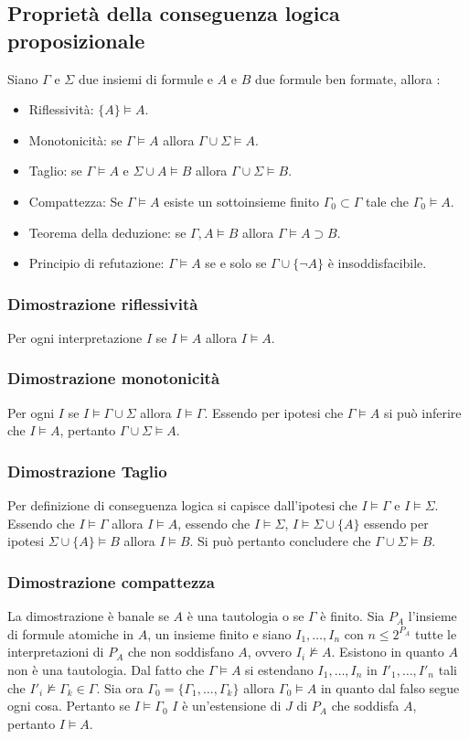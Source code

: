 \subsection{Propriet\`a della conseguenza logica proposizionale}
Siano $\Gamma$ e $\Sigma$ due insiemi di formule e $A$ e $B$ due formule ben formate, allora :
\begin{itemize}
\item Riflessivit\`a: $\{A\}\models A$.
\item Monotonicit\`a: se $\Gamma\models A$ allora $\Gamma\cup\Sigma\models A$.
\item Taglio: se $\Gamma\models A$ e $\Sigma \cup A\models B$ allora $\Gamma\cup\Sigma\models B$.
\item Compattezza: Se $\Gamma\models A$ esiste un sottoinsieme finito $\Gamma_0\subset\Gamma$ tale che $\Gamma_0\models A$. 
\item Teorema della deduzione: se $\Gamma, A\models B$ allora $\Gamma\models A\supset B$.
\item Principio di refutazione: $\Gamma\models A$ se e solo se $\Gamma\cup\{\neg A\}$ \`e insoddisfacibile.
\end{itemize}
\subsubsection{Dimostrazione riflessivit\`a}
Per ogni interpretazione $I$ se $I\models A$ allora $I\models A$.
\subsubsection{Dimostrazione monotonicit\`a}
Per ogni $I$ se $I\models \Gamma\cup\Sigma$ allora $I\models\Gamma$. Essendo per ipotesi che $\Gamma\models A$ si pu\`o inferire che $I\models A$, pertanto 
$\Gamma\cup\Sigma\models A$.
\subsubsection{Dimostrazione Taglio}
Per definizione di conseguenza logica si capisce dall'ipotesi che $I\models \Gamma$ e $I\models \Sigma$. Essendo che $I\models \Gamma$ allora $I\models A$,
essendo che $I\models\Sigma$, $I\models\Sigma\cup\{A\}$ essendo per ipotesi $\Sigma\cup\{A\}\models B$ allora $I\models B$. Si pu\`o pertanto concludere che
$\Gamma\cup\Sigma\models B$.
\subsubsection{Dimostrazione compattezza}
La dimostrazione \`e banale se $A$ \`e una tautologia o se $\Gamma$ \`e finito. Sia $P_A$ l'insieme di formule atomiche in $A$, un insieme finito e siano
$I_1, \dots, I_n$ con $n\le 2^{P_A}$ tutte le interpretazioni di $P_A$ che non soddisfano $A$, ovvero $I_i\not\models A$. Esistono in quanto $A$ non \`e una
tautologia. Dal fatto che $\Gamma\models A$ si estendano $I_1, \dots, I_n$ in $I'_1, \dots, I'_n$ tali che $I'_i\not\models \Gamma_k\in \Gamma$. Sia ora
$\Gamma_0=\{\Gamma_1, \dots, \Gamma_k\}$ allora $\Gamma_0\models A$ in quanto dal falso segue ogni cosa. Pertanto se $I\models\Gamma_0$ $I$ \`e 
un'estensione di $J$ di $P_A$ che soddisfa $A$, pertanto $I\models A$. 
